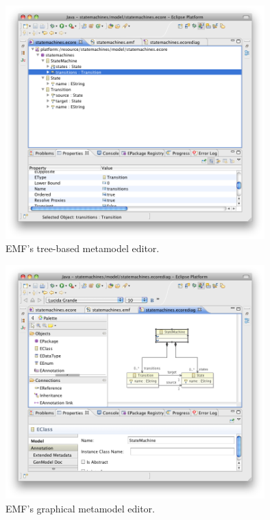 \begin{figure}[htbp]
  \begin{center}
    \leavevmode
    \includegraphics[width=10cm]{2.Background/images/emf_metamodel_tree.png}
  \end{center}
  \caption{EMF's tree-based metamodel editor.}
  \label{fig:emf_metamodel_editor_tree}
\end{figure}

\begin{figure}[htbp]
  \begin{center}
    \leavevmode
    \includegraphics[width=10cm]{2.Background/images/emf_metamodel_diagrammatic.png}
  \end{center}
  \caption{EMF's graphical metamodel editor.}
  \label{fig:emf_metamodel_editor_diagrammatic}
\end{figure}

